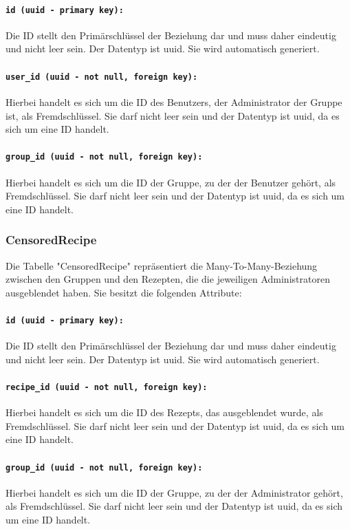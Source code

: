 \documentclass{entwurfsheft}
\begin{document}
\begin{sloppypar}
\paragraph{\texttt{id (uuid - primary key):}} Die ID stellt den Primärschlüssel der Beziehung dar und muss daher eindeutig und nicht leer sein. Der Datentyp ist \Gls{uuid}. Sie wird automatisch generiert.
\paragraph{\texttt{user\_id (uuid - not null, foreign key):}} Hierbei handelt es sich um die ID des Benutzers, der Administrator der Gruppe ist, als Fremdschlüssel. Sie darf nicht leer sein und der Datentyp ist \Gls{uuid}, da es sich um eine ID handelt.
\paragraph{\texttt{group\_id (uuid - not null, foreign key):}} Hierbei handelt es sich um die ID der Gruppe, zu der der Benutzer gehört, als Fremdschlüssel. Sie darf nicht leer sein und der Datentyp ist \Gls{uuid}, da es sich um eine ID handelt.
\newpage
\subsubsection{CensoredRecipe}
Die Tabelle "CensoredRecipe" repräsentiert die Many-To-Many-Beziehung zwischen den Gruppen und den Rezepten, die die jeweiligen Administratoren ausgeblendet haben. Sie besitzt die folgenden Attribute:
\paragraph{\texttt{id (uuid - primary key):}} Die ID stellt den Primärschlüssel der Beziehung dar und muss daher eindeutig und nicht leer sein. Der Datentyp ist \Gls{uuid}. Sie wird automatisch generiert.
\paragraph{\texttt{recipe\_id (uuid - not null, foreign key):}} Hierbei handelt es sich um die ID des Rezepts, das ausgeblendet wurde, als Fremdschlüssel. Sie darf nicht leer sein und der Datentyp ist \Gls{uuid}, da es sich um eine ID handelt.
\paragraph{\texttt{group\_id (uuid - not null, foreign key):}} Hierbei handelt es sich um die ID der Gruppe, zu der der Administrator gehört, als Fremdschlüssel. Sie darf nicht leer sein und der Datentyp ist \Gls{uuid}, da es sich um eine ID handelt.
\newpage


\end{sloppypar}
\end{document}
